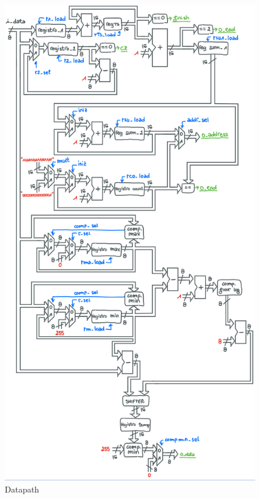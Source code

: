 \begin{figure}[ht]
    \centering
    \includegraphics[scale = 0.34]{Figure/Datapath} 
    \caption{Datapath}
    \label{Datapath}
\end{figure}

\clearpage





